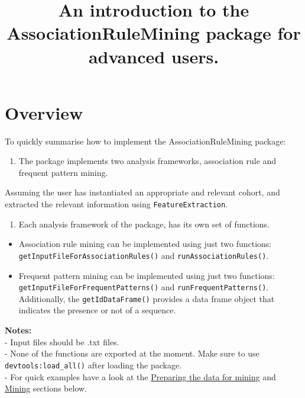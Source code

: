 \documentclass[
]{article}
\title{An introduction to the AssociationRuleMining package for advanced users.}
\author{}
\date{\vspace{-2.5em}}
\providecommand{\tightlist}{%
  \setlength{\itemsep}{0pt}\setlength{\parskip}{0pt}}
\begin{document}
\maketitle

\hypertarget{overview}{%
\section{Overview}\label{overview}}

To quickly summarise how to implement the AssociationRuleMining package:

\begin{enumerate}
\def\labelenumi{\arabic{enumi})}
\tightlist
\item
  The package implements two analysis frameworks, association rule and
  frequent pattern mining.
\end{enumerate}

Assuming the user has instantiated an appropriate and relevant cohort,
and extracted the relevant information using \texttt{FeatureExtraction}.

\begin{enumerate}
\def\labelenumi{\arabic{enumi})}
\setcounter{enumi}{1}
\tightlist
\item
  Each analysis framework of the package, has its own set of functions.
\end{enumerate}

\begin{itemize}
\item
  Association rule mining can be implemented using just two functions:
  \texttt{getInputFileForAssociationRules()} and
  \texttt{runAssociationRules()}.
\item
  Frequent pattern mining can be implemented using just two functions:
  \texttt{getInputFileForFrequentPatterns()} and
  \texttt{runFrequentPatterns()}. Additionally, the
  \texttt{getIdDataFrame()} provides a data frame object that indicates
  the presence or not of a sequence.
\end{itemize}

\textbf{Notes:}\\
- Input files should be .txt files.\\
- None of the functions are exported at the moment. Make sure to use
\texttt{devtools:load\_all()} after loading the package.\\
- For quick examples have a look at the
\protect\hyperlink{preparing-the-data-for-mining}{Preparing the data for
mining} and \protect\hyperlink{mining}{Mining} sections below.
\end{document}
